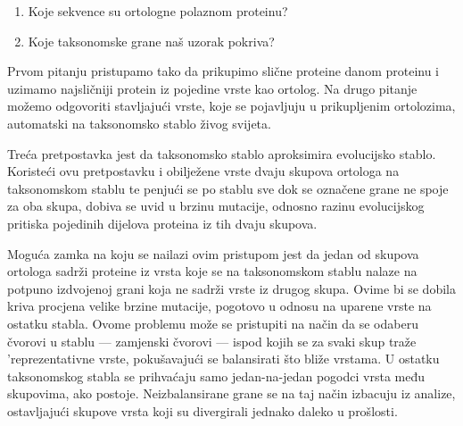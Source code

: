 \begin{enumerate}

    \item Koje sekvence su ortologne polaznom proteinu?

    \item Koje taksonomske grane naš uzorak pokriva?

\end{enumerate}
Prvom pitanju pristupamo tako da prikupimo slične proteine danom proteinu i
uzimamo najsličniji protein iz pojedine vrste kao ortolog. Na drugo pitanje
možemo odgovoriti stavljajući vrste, koje se pojavljuju u prikupljenim
ortolozima, automatski na taksonomsko stablo živog svijeta.

Treća pretpostavka jest da taksonomsko stablo aproksimira evolucijsko stablo.
Koristeći ovu pretpostavku i obilježene vrste dvaju skupova ortologa na
taksonomskom stablu te penjući se po stablu sve dok se označene grane ne spoje
za oba skupa, dobiva se uvid u brzinu mutacije, odnosno razinu evolucijskog
pritiska pojedinih dijelova proteina iz tih dvaju skupova.

Moguća zamka na koju se nailazi ovim pristupom jest da jedan od skupova ortologa
sadrži proteine iz vrsta koje se na taksonomskom stablu nalaze na potpuno
izdvojenoj grani koja ne sadrži vrste iz drugog skupa. Ovime bi se dobila kriva
procjena velike brzine mutacije, pogotovo u odnosu na uparene vrste na ostatku
stabla. Ovome problemu može se pristupiti na način da se odaberu čvorovi u
stablu --- zamjenski čvorovi --- ispod kojih se za svaki skup traže
'reprezentativne vrste, pokušavajući se balansirati što bliže vrstama. U
ostatku taksonomskog stabla se prihvaćaju samo jedan-na-jedan pogodci vrsta među
skupovima, ako postoje. Neizbalansirane grane se na taj način izbacuju iz
analize, ostavljajući skupove vrsta koji su divergirali jednako daleko u
prošlosti.


